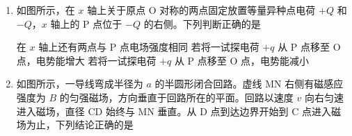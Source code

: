 \documentclass[\gkver]{gaokaozhenti}
\begin{document}
\begin{enumerate}
{远距离输电，从图中应该看出功率之间的关系是：$P_{1}=P_{2}$，$P_{3}=P_{4}$，$P_{1}'=P_{r}=P_{2}$。电压之间的关系是：$\frac{U_{1}}{U_{2}}=\frac{n_{1}}{n_{2}}$，$\frac{U_{3}}{U_{4}}=\frac{n_{3}}{n_{4}}$，$U_{2}=U_{r}+U_{3}$。电流之间的关系是：$\frac{I_{1}}{I_{2}}=\frac{n_{2}}{n_{1}}$，$\frac{I_{3}}{I_{4}}=\frac{n_{4}}{n_{3}}$，$I_{2}=I_{r}=I_{3}$。输电线上的功率损失和电压损失也是需要特别注意的。分析和计算时都必须用 $P_{r}=I_{2}^{2}r$，$U_{r}=I_{2}r$，而不能用 $P_{r}=\frac{U_{r}^{2}}{r}$。特别重要的是要会分析输电线上的功率损失 $P_{r}=\left(\frac{P_{1}}{U_{2}}\right)^{2}\cdot\rho\frac{l}{S}\propto\frac{1}{U_{2}^{2}S}$。
}

\item
如图所示，在 $x$ 轴上关于原点 O 对称的两点固定放置等量异种点电荷 $+Q$ 和 $-Q$，$x$ 轴上的 P 点位于 $-Q$ 的右侧。下列判断正确的是


{在 $x$ 轴上还有两点与 P 点电场强度相同}
{若将一试探电荷 $+q$ 从 P 点移至 O 点，电势能增大}
{若将一试探电荷 $+q$ 从 P 点移至 O 点，电势能减小}


\item
如图所示，一导线弯成半径为 $a$ 的半圆形闭合回路。虚线 MN 右侧有磁感应强度为 $B$ 的匀强磁场，方向垂直于回路所在的平面。回路以速度 $v$ 向右匀速进入磁场，直径 CD 始终与 MN 垂直。从 D 点到达边界开始到 C 点进入磁场为止，下列结论正确的是


\end{enumerate}
\end{document}

